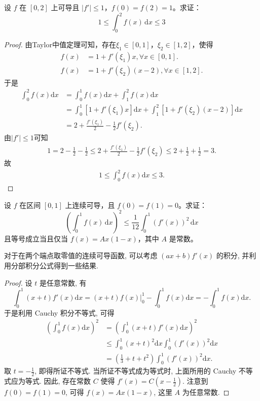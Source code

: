 \documentclass[../../main.tex]{subfiles}
\begin{document}
\begin{example}
设 \( f \) 在 \([0,2]\) 上可导且 \(|f'| \leqslant 1\)，\( f(0) = f(2) = 1 \)。求证：
\[
1 \leqslant \int_{0}^{2} f(x) \, \mathrm{d}x \leqslant 3
\]
\end{example}
\begin{proof}
由Taylor中值定理可知，存在$\xi_1\in[0,1]$，$\xi_2\in[1,2]$，使得
\begin{align*}
f(x)&=1+f'(\xi_1)x,\forall x\in[0,1].\\
f(x)&=1+f'(\xi_2)(x-2),\forall x\in[1,2].
\end{align*}
于是
\begin{align*}
\int_0^2 f(x)\mathrm{d}x&=\int_0^1 f(x)\mathrm{d}x+\int_1^2 f(x)\mathrm{d}x\\
&=\int_0^1 [1+f'(\xi_1)x]\mathrm{d}x+\int_1^2 [1+f'(\xi_2)(x-2)]\mathrm{d}x\\
&=2+\frac{f'(\xi_1)}{2}-\frac{1}{2}f'(\xi_2).
\end{align*}
由$|f'|\leqslant1$可知
\begin{align*}
1=2-\frac{1}{2}-\frac{1}{2}\leqslant 2+\frac{f'(\xi_1)}{2}-\frac{1}{2}f'(\xi_2)\leqslant 2+\frac{1}{2}+\frac{1}{2}=3.
\end{align*}
故
\begin{align*}
1\leqslant \int_0^2 f(x)\mathrm{d}x\leqslant 3.
\end{align*}

\end{proof}

\begin{example}
设 \( f \) 在区间 \([0,1]\) 上连续可导，且 \( f(0) = f(1) = 0 \)。求证：
\[
\left( \int_{0}^{1} f(x) \, \mathrm{d}x \right)^{2} \leqslant \frac{1}{12} \int_{0}^{1} \left( f'(x) \right)^{2} \, \mathrm{d}x
\]
且等号成立当且仅当 \( f(x) = Ax(1 - x) \)，其中 \( A \) 是常数。
\end{example}
\begin{note}
对于在两个端点取零值的连续可导函数, 可以考虑 \((ax + b)f'(x)\) 的积分, 并利用分部积分公式得到一些结果.
\end{note}
\begin{proof}
设 \(t\) 是任意常数, 有
\[
\int_0^1 (x + t)f'(x)\mathrm{d}x = (x + t)f(x) \Big|_0^1 - \int_0^1 f(x)\mathrm{d}x = -\int_0^1 f(x)\mathrm{d}x.
\]
于是利用 Cauchy 积分不等式, 可得
\begin{align*}
\left(\int_0^1 f(x)\mathrm{d}x\right)^2 &= \left(\int_0^1 (x + t)f'(x)\mathrm{d}x\right)^2\\
&\leqslant \int_0^1 (x + t)^2\mathrm{d}x \int_0^1 (f'(x))^2\mathrm{d}x\\
&= \left(\frac{1}{3} + t + t^2\right)\int_0^1 (f'(x))^2\mathrm{d}x.
\end{align*}
取 \(t = -\frac{1}{2}\), 即得所证不等式. 当所证不等式成为等式时, 上面所用的 Cauchy 不等式应为等式. 因此, 存在常数 \(C\) 使得 \(f'(x) = C\left(x - \frac{1}{2}\right)\). 注意到 \(f(0) = f(1) = 0\), 可得 \(f(x) = Ax(1 - x)\), 这里 \(A\) 为任意常数.

\end{proof}
\end{document}
